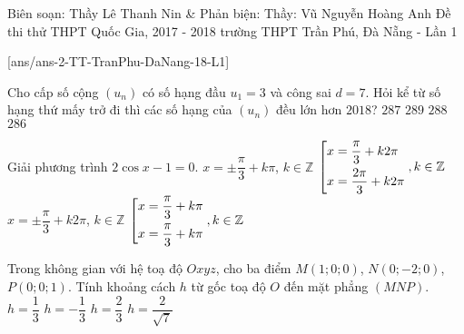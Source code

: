 	\begin{name}
		{Biên soạn: Thầy Lê Thanh Nin \& Phản biện: Thầy: Vũ Nguyễn Hoàng Anh}
		{Đề thi thử THPT Quốc Gia, 2017 - 2018 trường THPT Trần Phú, Đà Nẵng - Lần 1}
	\end{name}
	\setcounter{ex}{0}\setcounter{bt}{0}
	[ans/ans-2-TT-TranPhu-DaNang-18-L1]
	
	
	\begin{ex}%
		Cho cấp số cộng $(u_n)$ có số hạng đầu $u_1=3$ và công sai $d=7$. Hỏi kể từ số hạng thứ mấy trở đi thì các số hạng của $(u_n)$ đều lớn hơn $2018$?
		\choice
		{$287$}
		{\True $289$}
		{$288$}
		{$286$}
	\end{ex}
	
	\begin{ex}%
		Giải phương trình $2\cos x -1=0$.
		\choice
		{$x=\pm \dfrac{\pi}{3}+k\pi$, $k \in \mathbb{Z}$}
		{$\left[\begin{aligned}&x=\dfrac{\pi}{3}+k2\pi\\&x=\dfrac{2\pi}{3}+k2\pi\\\end{aligned}\right., k\in \mathbb{Z}$}
		{\True $x=\pm \dfrac{\pi}{3}+k2\pi$, $k\in \mathbb{Z}$}
		{$\left[\begin{aligned}&x=\dfrac{\pi}{3}+k\pi\\&x=\dfrac{\pi}{3}+k\pi\\\end{aligned}\right., k\in \mathbb{Z}$}
	\end{ex}
	
	\begin{ex}%
		Trong không gian với hệ toạ độ $Oxyz$, cho ba điểm $M(1;0;0)$, $N(0;-2;0)$, $P(0;0;1)$. Tính khoảng cách $h$ từ gốc toạ độ $O$ đến mặt phẳng $(MNP)$.
		\choice
		{$h=\dfrac{1}{3}$}
		{$h=-\dfrac{1}{3}$}
		{\True $h=\dfrac{2}{3}$}
		{$h=\dfrac{2}{\sqrt{7}}$}
	\end{ex}

